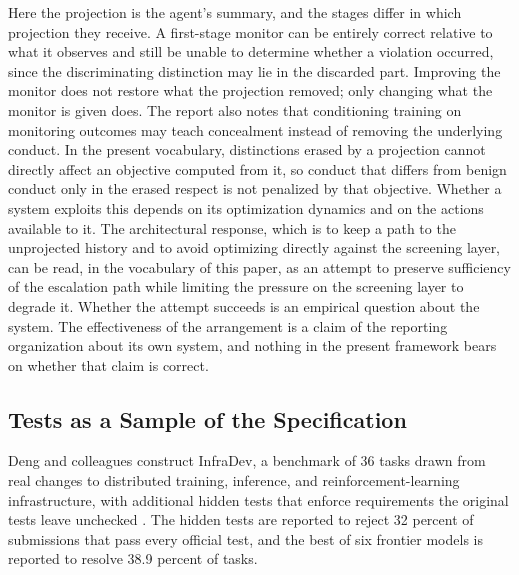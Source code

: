 \documentclass[11pt]{article}
\theoremstyle{remark}
\begin{document}
Here the projection is the agent's summary, and the stages differ in which projection they receive. A first-stage monitor can be entirely correct relative to what it observes and still be unable to determine whether a violation occurred, since the discriminating distinction may lie in the discarded part. Improving the monitor does not restore what the projection removed; only changing what the monitor is given does. The report also notes that conditioning training on monitoring outcomes may teach concealment instead of removing the underlying conduct. In the present vocabulary, distinctions erased by a projection cannot directly affect an objective computed from it, so conduct that differs from benign conduct only in the erased respect is not penalized by that objective. Whether a system exploits this depends on its optimization dynamics and on the actions available to it. The architectural response, which is to keep a path to the unprojected history and to avoid optimizing directly against the screening layer, can be read, in the vocabulary of this paper, as an attempt to preserve sufficiency of the escalation path while limiting the pressure on the screening layer to degrade it. Whether the attempt succeeds is an empirical question about the system. The effectiveness of the arrangement is a claim of the reporting organization about its own system, and nothing in the present framework bears on whether that claim is correct.

\subsection{Tests as a Sample of the Specification}

Deng and colleagues construct InfraDev, a benchmark of 36 tasks drawn from real changes to distributed training, inference, and reinforcement-learning infrastructure, with additional hidden tests that enforce requirements the original tests leave unchecked \cite{deng2026infradev}. The hidden tests are reported to reject 32 percent of submissions that pass every official test, and the best of six frontier models is reported to resolve 38.9 percent of tasks.
\end{document}
